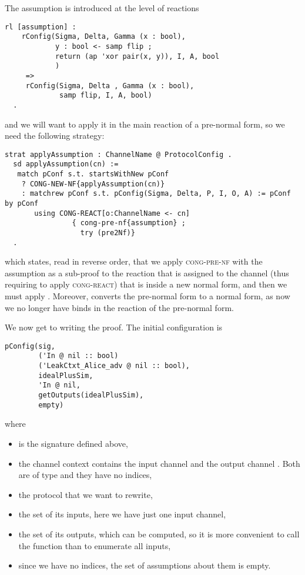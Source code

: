 The assumption is introduced at the level of reactions
\begin{lstlisting}
rl [assumption] :
    rConfig(Sigma, Delta, Gamma (x : bool),
            y : bool <- samp flip ; 
            return (ap 'xor pair(x, y)), I, A, bool
            )
     => 
     rConfig(Sigma, Delta , Gamma (x : bool),
             samp flip, I, A, bool)
  .  
\end{lstlisting}
\noindent and we will want to apply it in the 
main reaction of a pre-normal form, so we need the following strategy:
\begin{lstlisting}
strat applyAssumption : ChannelName @ ProtocolConfig .
  sd applyAssumption(cn) := 
   match pConf s.t. startsWithNew pConf
    ? CONG-NEW-NF{applyAssumption(cn)}
    : matchrew pConf s.t. pConfig(Sigma, Delta, P, I, O, A) := pConf by pConf 
       using CONG-REACT[o:ChannelName <- cn]
                { cong-pre-nf{assumption} ; 
                  try (pre2Nf)}   
  .
\end{lstlisting}
\noindent which states, read in reverse order, that we apply 
\textsc{cong-pre-nf} with the assumption as a sub-proof 
to the reaction  that is assigned to the channel 
(thus requiring to apply \textsc{cong-react}) 
that is inside a new normal form, and then we must apply
. Moreover,  converts the
pre-normal form to a normal form, as now we no longer have binds in the
reaction of the pre-normal form.

We now get to writing the proof. The initial configuration is
\begin{lstlisting}
pConfig(sig, 
        ('In @ nil :: bool) 
        ('LeakCtxt_Alice_adv @ nil :: bool), 
        idealPlusSim, 
        'In @ nil, 
        getOutputs(idealPlusSim), 
        empty)
\end{lstlisting}
\noindent where 
\begin{itemize}
 \item {} is the signature defined above,
 \item the channel context contains the input channel 
       and the output channel . Both are of type
        and they have no indices,
 \item the protocol that we want to rewrite,
 \item the set of its inputs, here we have just one input channel,      
 \item the set of its outputs, which can be computed, so it is more
       convenient to call the function  than to
       enumerate all inputs,
 \item since we have no indices, the set of assumptions about them is empty.      
\end{itemize}

